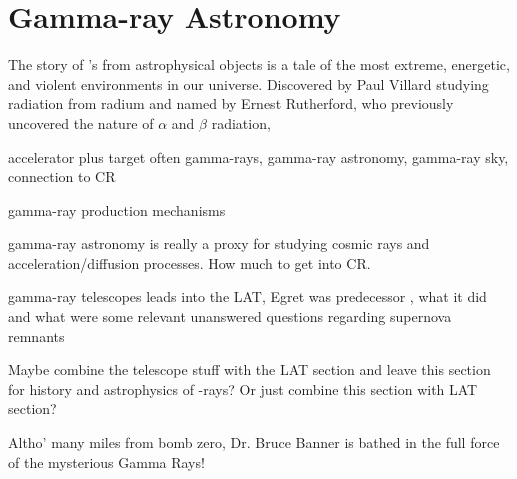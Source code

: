 \chapter{Gamma-ray Astronomy}
\label{chap:gamAstr}

The story of \gam 's from astrophysical objects is a tale of the most extreme, energetic, and violent environments in our universe. Discovered by Paul Villard studying radiation from radium and named by Ernest Rutherford, who previously uncovered the nature of $\alpha$ and $\beta$ radiation, 

accelerator plus target often {}
gamma-rays, gamma-ray astronomy, gamma-ray sky, connection to CR

gamma-ray production mechanisms

gamma-ray astronomy is really a proxy for studying cosmic rays and acceleration/diffusion processes. How much to get into CR. 

gamma-ray telescopes leads into the LAT, Egret was  predecessor , what it did and what were some relevant unanswered questions regarding supernova remnants 
    
Maybe combine the telescope stuff  with the LAT section and leave this section for history and astrophysics of \g-rays? Or just combine this section with  LAT section?

Altho' many miles from bomb zero, Dr. Bruce Banner is bathed in the full force of the mysterious Gamma Rays!
